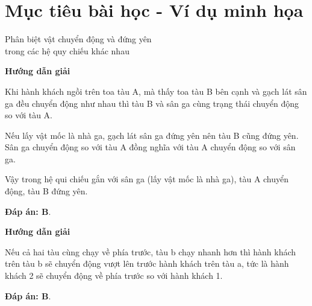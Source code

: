 \section{Mục tiêu bài học - Ví dụ minh họa}

\begin{dang}{Phân biệt vật chuyển động và đứng yên\\ trong các hệ quy chiếu khác nhau}
	{	\begin{center}
			\textbf{Hướng dẫn giải}
		\end{center}
		
		Khi hành khách ngồi trên toa tàu A, mà thấy toa tàu B bên cạnh và gạch lát sân ga đều chuyển động như nhau thì tàu B và sân ga cùng trạng thái chuyển động so với tàu A.
		
		Nếu lấy vật mốc là nhà ga, gạch lát sân ga đứng yên nên tàu B cũng đứng yên. Sân ga chuyển động so với tàu A đồng nghĩa với tàu A chuyển động so với sân ga. 
		
		Vậy trong hệ qui chiếu  gắn với sân ga (lấy vật mốc là nhà ga), tàu A chuyển động, tàu B đứng yên.
		
		
		
		\textbf{Đáp án: B}.
	}
	{	\begin{center}
			\textbf{Hướng dẫn giải}
		\end{center}
		
		Nếu cả hai tàu cùng chạy về phía trước, tàu b chạy nhanh hơn thì hành khách trên  tàu b sẽ chuyển động vượt lên trước hành khách trên tàu a, tức là hành khách 2 sẽ chuyển động về phía trước so với hành khách 1. 
		
		\textbf{Đáp án: B}.
	}
\end{dang}
